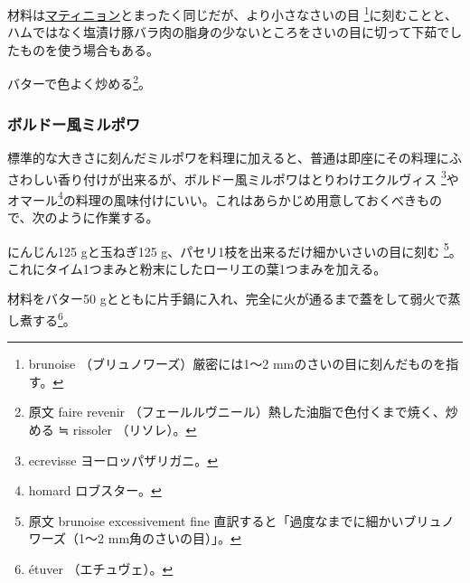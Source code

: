 \begin{recette}

 

材料は\protect\hyperlink{matignon}{マティニョン}とまったく同じだが、より小さなさいの目
\footnote{brunoise （ブリュノワーズ）厳密には1〜2
  mmのさいの目に刻んだものを指す。}に刻むことと、ハムではなく塩漬け豚バラ肉の脂身の少ないところをさいの目に切って下茹でしたものを使う場合もある。

バターで色よく炒める\footnote{原文 faire revenir
  （フェールルヴニール）熱した油脂で色付くまで焼く、炒める ≒ rissoler
  （リソレ）。}。

\hypertarget{mirepoix-fine}{%
\subsubsection{ボルドー風ミルポワ}\label{mirepoix-fine}}



標準的な大きさに刻んだミルポワを料理に加えると、普通は即座にその料理にふさわしい香り付けが出来るが、ボルドー風ミルポワはとりわけエクルヴィス
\footnote{ecrevisse ヨーロッパザリガニ。}やオマール\footnote{homard
  ロブスター。}の料理の風味付けにいい。これはあらかじめ用意しておくべきもので、次のように作業する。

にんじん125 gと玉ねぎ125 g、パセリ1枝を出来るだけ細かいさいの目に刻む
\footnote{原文 brunoise excessivement fine
  直訳すると「過度なまでに細かいブリュノワーズ（1〜2
  mm角のさいの目）」。}。これにタイム1つまみと粉末にしたローリエの葉1つまみを加える。

材料をバター50
gとともに片手鍋に入れ、完全に火が通るまで蓋をして弱火で蒸し煮する\footnote{étuver
  （エチュヴェ）。}。


\end{recette}
